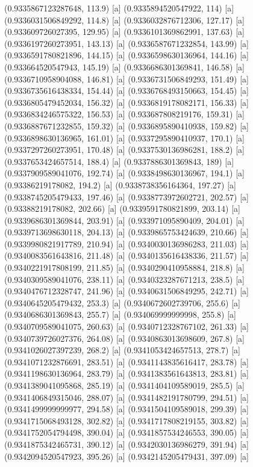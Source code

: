 {{{(0.9335867123287648, 113.9) [a] 
(0.9335894520547922, 114) [a] 
(0.9336031506849292, 114.8) [a] 
(0.9336032876712306, 127.17) [a] 
(0.933609726027395, 129.95) [a] 
(0.9336101369862991, 137.63) [a] 
(0.9336197260273951, 143.13) [a] 
(0.9336587671232854, 143.99) [a] 
(0.9336591780821896, 144.15) [a] 
(0.9336598630136964, 144.16) [a] 
(0.933664520547943, 145.19) [a] 
(0.9336686301369841, 146.58) [a] 
(0.9336710958904088, 146.81) [a] 
(0.9336731506849293, 151.49) [a] 
(0.9336735616438334, 154.44) [a] 
(0.9336768493150663, 154.45) [a] 
(0.9336805479452034, 156.32) [a] 
(0.9336819178082171, 156.33) [a] 
(0.9336834246575322, 156.53) [a] 
(0.933687808219176, 159.31) [a] 
(0.9336887671232855, 159.32) [a] 
(0.9336895890410938, 159.82) [a] 
(0.9336898630136965, 161.01) [a] 
(0.9337295890410937, 170.1) [a] 
(0.9337297260273951, 170.48) [a] 
(0.9337530136986281, 188.2) [a] 
(0.9337653424657514, 188.4) [a] 
(0.9337886301369843, 189) [a] 
(0.9337909589041076, 192.74) [a] 
(0.9338498630136967, 194.1) [a] 
(0.93386219178082, 194.2) [a] 
(0.9338738356164364, 197.27) [a] 
(0.9338745205479433, 197.46) [a] 
(0.9338773972602721, 202.57) [a] 
(0.93388219178082, 202.66) [a] 
(0.9339591780821899, 203.14) [a] 
(0.9339686301369844, 203.91) [a] 
(0.933971095890409, 204.01) [a] 
(0.9339713698630118, 204.13) [a] 
(0.9339865753424639, 210.66) [a] 
(0.9339980821917789, 210.94) [a] 
(0.9340030136986283, 211.03) [a] 
(0.9340083561643816, 211.48) [a] 
(0.9340135616438336, 211.57) [a] 
(0.9340221917808199, 211.85) [a] 
(0.9340290410958884, 218.8) [a] 
(0.9340309589041076, 238.11) [a] 
(0.9340323287671213, 238.5) [a] 
(0.9340476712328747, 241.96) [a] 
(0.9340631506849295, 242.71) [a] 
(0.9340645205479432, 253.3) [a] 
(0.9340672602739706, 255.6) [a] 
(0.9340686301369843, 255.7) [a] 
(0.934069999999998, 255.8) [a] 
(0.9340709589041075, 260.63) [a] 
(0.9340712328767102, 261.33) [a] 
(0.9340739726027376, 264.08) [a] 
(0.9340863013698609, 267.8) [a] 
(0.9341026027397239, 268.2) [a] 
(0.9341053424657513, 278.7) [a] 
(0.9341071232876691, 283.51) [a] 
(0.9341143835616417, 283.78) [a] 
(0.9341198630136964, 283.79) [a] 
(0.9341383561643813, 283.81) [a] 
(0.9341389041095868, 285.19) [a] 
(0.9341404109589019, 285.5) [a] 
(0.9341406849315046, 288.07) [a] 
(0.9341482191780799, 294.51) [a] 
(0.9341499999999977, 294.58) [a] 
(0.9341504109589018, 299.39) [a] 
(0.9341715068493128, 302.82) [a] 
(0.9341717808219155, 303.82) [a] 
(0.9341752054794498, 390.04) [a] 
(0.9341857534246553, 390.05) [a] 
(0.9341875342465731, 390.12) [a] 
(0.9342030136986279, 391.94) [a] 
(0.9342094520547923, 395.26) [a] 
(0.9342145205479431, 397.09) [a] 
}}}

